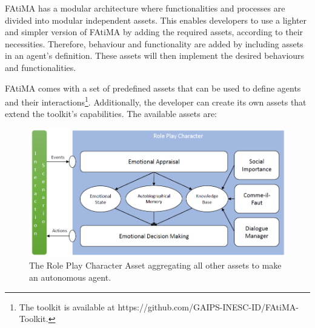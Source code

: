 \ac{FAtiMA} has a modular architecture where functionalities and processes are divided into modular independent assets.
This enables developers to use a lighter and simpler version of \ac{FAtiMA} by adding the required assets, according to their necessities.
Therefore, behaviour and functionality are added by including assets in an agent's definition.
These assets will then implement the desired behaviours and functionalities.

\ac{FAtiMA} comes with a set of predefined assets that can be used to define agents and their interactions\footnote{The toolkit is available at https://github.com/GAIPS-INESC-ID/FAtiMA-Toolkit.}.
Additionally, the developer can create its own assets that extend the toolkit's capabilities.
The available assets are:

\begin{figure}
  \centering
  \includegraphics[width=\textwidth]{./Images/rpc}
  \caption{The Role Play Character Asset aggregating all other assets to make an autonomous agent.}
  \label{fig:rpc}
\end{figure}

